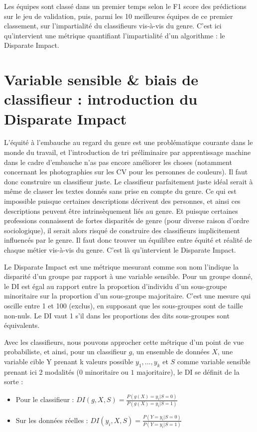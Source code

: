 Les équipes sont classé dans un premier temps selon le F1 score des prédictions sur le jeu de validation, puis, parmi les 10 meilleures équipes de ce premier classement, sur l’impartialité du classifieurs vis-à-vis du genre. C’est ici qu’intervient une métrique quantifiant l’impartialité d’un algorithme : le Disparate Impact. 


\section{Variable sensible & biais de classifieur : introduction du Disparate Impact}

L’équité à l’embauche au regard du genre est une problématique courante dans le monde du travail, et l’introduction de tri préliminaire par apprentissage machine dans le cadre d’embauche n’as pas encore améliorer les choses (notamment concernant les photographies sur les CV pour les personnes de couleurs). Il faut donc construire un classifieur juste. Le classifieur parfaitement juste idéal serait à même de classer les textes donnés sans prise en compte du genre. Ce qui est impossible puisque certaines descriptions décrivent des personnes, et ainsi ces descriptions peuvent être intrinsèquement liés au genre. Et puisque certaines professions connaissent de fortes disparités de genre (pour diverse raison d’ordre sociologique), il serait alors risqué de construire des classifieurs implicitement influencés par le genre. Il faut donc trouver un équilibre entre équité et réalité de chaque métier vis-à-vis du genre. C’est là qu’intervient le Disparate Impact.

Le Disparate Impact est une métrique mesurant comme son nom l’indique la disparité d’un groupe par rapport à une variable sensible. Pour un groupe donné, le DI est égal au rapport entre la proportion d’individu d’un sous-groupe minoritaire sur la proportion d’un sous-groupe majoritaire. C’est une mesure qui oscille entre 1 et 100 (exclus), en supposant que les sous-groupes sont de taille non-nuls. Le DI vaut 1 s’il dans les proportions des dits sous-groupes sont équivalents.

Avec les classifieurs, nous pouvons approcher cette métrique d’un point de vue probabiliste, et ainsi, pour un classifieur $g$, un ensemble de données $X$, une variable cible Y prenant k valeurs possible ${y_1,…,y_k}$ et $S$ comme variable sensible prenant ici 2 modalités ($0$ minoritaire ou $1$ majoritaire), le DI se définit de la sorte :

\begin{itemize}
\item Pour le classifieur : $DI(g, X, S) = \frac{P(g(X) = y_i | S=0)}{P(g(X) = y_i | S=1)}$
\item Sur les données réelles : $DI(y_i, X, S) = \frac{P(Y = y_i | S=0)}{P(Y = y_i | S=1)}$
\end{itemize}

